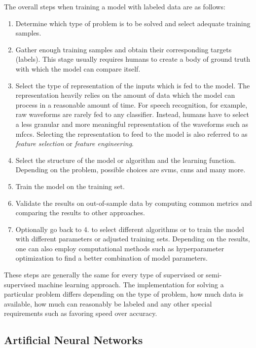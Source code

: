 \documentclass[draft,final]{vutinfth} %
\begin{document}
The overall steps when training a model with labeled data are as
follows:

\begin{enumerate}
\item Determine which type of problem is to be solved and select
  adequate training samples.
\item Gather enough training samples and obtain their corresponding
  targets (labels). This stage usually requires humans to create a
  body of ground truth with which the model can compare itself.
\item Select the type of representation of the inputs which is fed to
  the model. The representation heavily relies on the amount of data
  which the model can process in a reasonable amount of time. For
  speech recognition, for example, raw waveforms are rarely fed to any
  classifier. Instead, humans have to select a less granular and more
  meaningful representation of the waveforms such as
  \glspl{mfcc}. Selecting the representation to feed to the model is
  also referred to as \emph{feature selection} or \emph{feature
  engineering}.
\item Select the structure of the model or algorithm and the learning
  function. Depending on the problem, possible choices are
  \glspl{svm}, \glspl{cnn} and many more.
\item Train the model on the training set.
\item Validate the results on out-of-sample data by computing common
  metrics and comparing the results to other approaches.
\item Optionally go back to 4. to select different algorithms or to
  train the model with different parameters or adjusted training
  sets. Depending on the results, one can also employ computational
  methods such as hyperparameter optimization to find a better
  combination of model parameters.
\end{enumerate}

These steps are generally the same for every type of supervised or
semi-supervised machine learning approach. The implementation for
solving a particular problem differs depending on the type of problem,
how much data is available, how much can reasonably be labeled and any
other special requirements such as favoring speed over accuracy.

\subsection{Artificial Neural Networks}
\label{ssec:theory-nn}
\end{document}
